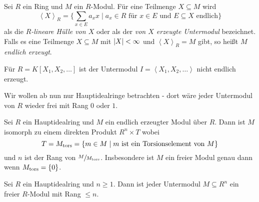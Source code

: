 \begin{definition}
	Sei $R$ ein Ring und $M $ ein $R$-Modul.
	Für eine Teilmenge $X \subseteq M$ wird
	\[
	\left< X \right>_{R} = \{\sum_{x \in E} a_{x} x \mid a_{x} \in R \text{ für $x \in E$ und $E \subseteq X$ endlich}\} 
	\]
	als die \emph{$R$-lineare Hülle von $X$} oder als der \emph{von $X$ erzeugte Untermodul} bezeichnet.
	Falls es eine Teilmenge $X \subseteq M$ mit $\abs{X} < \infty$ und $\left< X \right>_{R} = M$ gibt, so heißt $M$ \emph{endlich erzeugt}.
\end{definition}

\begin{eg}
	Für $R = K[X_1,X_2,\ldots]$ ist der Untermodul $I = \left< X_1,X_2,\ldots \right>$ nicht endlich erzeugt.
\end{eg}

Wir wollen ab nun nur Hauptidealringe betrachten - dort wäre jeder Untermodul von $R$ wieder frei mit Rang $0$ oder $1$.

\begin{theorem}
	Sei $R$ ein Hauptidealring und $M$ ein endlich erzeugter Modul über $R$.
	Dann ist $M$ isomorph zu einem direkten Produkt $R^{n} \times T$ wobei
	\[
		T = M_{\operatorname{tors}} = \{m \in M \mid m \text{ ist ein Torsionselement von } M\}
	\]
	und $n$ ist der Rang von $\sfrac{M}{M_{\operatorname{tors}}}$.
	Insbesondere ist $M$ ein freier Modul genau dann wenn $M_{\operatorname{tors}} = \{0\}$.
\end{theorem}

\begin{proposition}
	Sei $R$ ein Hauptidealring und $n \geq 1$. Dann ist jeder Untermodul $M \subseteq R^{n}$ ein freier $R$-Modul mit Rang $\leq n$.
\end{proposition}

